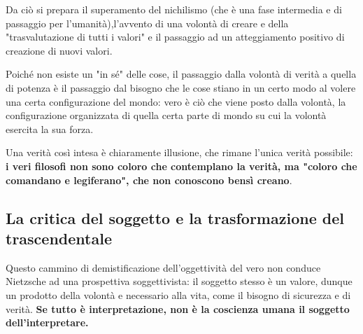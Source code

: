 Da ciò si prepara il superamento del nichilismo (che è una fase intermedia e di passaggio per l'umanità),l'avvento di una volontà di creare e della "trasvalutazione di tutti i valori" e il passaggio ad un atteggiamento positivo di creazione di nuovi valori.

Poiché non esiste un "in sé" delle cose, il passaggio dalla volontà di verità a quella di potenza è il passaggio dal bisogno che le cose stiano in un certo modo al volere una certa configurazione del mondo: vero è ciò che viene posto dalla volontà, la configurazione organizzata di quella certa parte di mondo su cui la volontà esercita la sua forza.

Una verità così intesa è chiaramente illusione, che rimane l'unica verità possibile: \textbf{i veri filosofi non sono coloro che contemplano la verità, ma "coloro che comandano e legiferano", che non conoscono bensì creano}.

\subsection{La critica del soggetto e la trasformazione del trascendentale}

Questo cammino di demistificazione dell'oggettività del vero non conduce Nietzsche ad una prospettiva soggettivista: il soggetto stesso è un valore, dunque un prodotto della volontà e necessario alla vita, come il bisogno di sicurezza e di verità.\textbf{ Se tutto è interpretazione, non è la coscienza umana il soggetto dell'interpretare.}




























